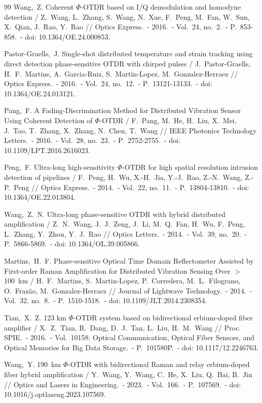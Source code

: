 \documentclass[12pt,a4paper]{extarticle}
\begin{document}
\begin{thebibliography}{99}
  Wang,~Z. Coherent $\Phi$-OTDR based on I/Q demodulation and homodyne detection / Z.~Wang, L.~Zhang, S.~Wang, N.~Xue, F.~Peng, M.~Fan, W.~Sun, X.~Qian, J.~Rao, Y.~Rao // Optics Express.~- 2016.~- Vol.~24, no.~2.~- P.~853-858.~- doi: 10.1364/OE.24.000853.

  Pastor-Graells,~J. Single-shot distributed temperature and strain tracking using direct detection phase-sensitive OTDR with chirped pulses / J.~Pastor-Graells, H.~F.~Martins, A.~Garcia-Ruiz, S.~Martin-Lopez, M.~Gonzalez-Herraez // Optics Express.~- 2016.~- Vol.~24, no.~12.~- P.~13121-13133.~- doi: 10.1364/OE.24.013121.

  Pang,~F. A Fading-Discrimination Method for Distributed Vibration Sensor Using Coherent Detection of $\Phi$-OTDR / F.~Pang, M.~He, H.~Liu, X.~Mei, J.~Tao, T.~Zhang, X.~Zhang, N.~Chen, T.~Wang // IEEE Photonics Technology Letters.~- 2016.~- Vol.~28, no.~23.~- P.~2752-2755.~- doi: 10.1109/LPT.2016.2616023.

  Peng,~F. Ultra-long high-sensitivity $\Phi$-OTDR for high spatial resolution intrusion detection of pipelines / F.~Peng, H.~Wu, X.-H.~Jia, Y.-J.~Rao, Z.-N.~Wang, Z.-P.~Peng // Optics Express.~- 2014.~- Vol.~22, no.~11.~- P.~13804-13810.~- doi: 10.1364/OE.22.013804.

  Wang,~Z.~N. Ultra-long phase-sensitive OTDR with hybrid distributed amplification / Z.~N.~Wang, J.~J.~Zeng, J.~Li, M.~Q.~Fan, H.~Wu, F.~Peng, L.~Zhang, Y.~Zhou, Y.~J.~Rao // Optics Letters.~- 2014.~- Vol.~39, no.~20.~- P.~5866-5869.~- doi: 10.1364/OL.39.005866.

  Martins,~H.~F. Phase-sensitive Optical Time Domain Reflectometer Assisted by First-order Raman Amplification for Distributed Vibration Sensing Over $>$100~km / H.~F.~Martins, S.~Martin-Lopez, P.~Corredera, M.~L.~Filograno, O.~Frazão, M.~Gonzalez-Herraez // Journal of Lightwave Technology.~- 2014.~- Vol.~32, no.~8.~- P.~1510-1518.~- doi: 10.1109/JLT.2014.2308354.

  Tian,~X.~Z. 123 km $\Phi$-OTDR system based on bidirectional erbium-doped fiber amplifier / X.~Z.~Tian, R.~Dang, D.~J.~Tan, L.~Liu, H.~M.~Wang // Proc. SPIE.~- 2016.~- Vol.~10158: Optical Communication, Optical Fiber Sensors, and Optical Memories for Big Data Storage.~- P.~101580P.~- doi: 10.1117/12.2246763.

  Wang,~Y. 190~km $\Phi$-OTDR with bidirectional Raman and relay erbium-doped fiber hybrid amplification / Y.~Wang, Y.~Wang, C.~He, X.~Liu, Q.~Bai, B.~Jin // Optics and Lasers in Engineering.~- 2023.~- Vol.~166.~- P.~107569.~- doi: 10.1016/j.optlaseng.2023.107569.


\end{thebibliography}
\end{document}
